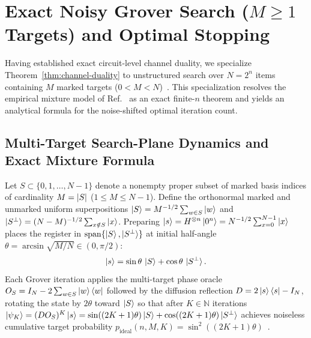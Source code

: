 \section{Exact Noisy Grover Search (\texorpdfstring{$M \ge 1$}{M >= 1} Targets) and Optimal Stopping}
\label{sec:grover}

Having established exact circuit-level channel duality, we specialize Theorem~\ref{thm:channel-duality} to unstructured search over $N = 2^n$ items containing $M$ marked targets ($0 < M < N$)~\cite{Grover1996,Boyer1998}. This specialization resolves the empirical mixture model of Ref.~\cite{SahaRoyLacalle2026} as an exact finite-$n$ theorem and yields an analytical formula for the noise-shifted optimal iteration count.

\subsection{Multi-Target Search-Plane Dynamics and Exact Mixture Formula}
\label{sec:multi-grover}

Let $S \subset \{0, 1, \dots, N - 1\}$ denote a nonempty proper subset of marked basis indices of cardinality $M = \lvert S\rvert$ ($1 \le M \le N - 1$). Define the orthonormal marked and unmarked uniform superpositions $\ket{S} = M^{-1/2}\sum_{w \in S}\ket{w}$ and $\ket{S^\perp} = (N - M)^{-1/2}\sum_{x \notin S}\ket{x}$. Preparing $\ket{s} = H^{\otimes n}\ket{0^n} = N^{-1/2}\sum_{x=0}^{N-1}\ket{x}$ places the register in $\operatorname{span}\{\ket{S}, \ket{S^\perp}\}$ at initial half-angle $\theta = \arcsin\sqrt{M/N} \in (0, \pi/2)$:
\begin{equation}
\ket{s} = \sin\theta\,\ket{S} + \cos\theta\,\ket{S^\perp}.
\label{eq:initial-search-plane}
\end{equation}
Each Grover iteration applies the multi-target phase oracle $O_S = I_N - 2\sum_{w \in S}\ket{w}\bra{w}$ followed by the diffusion reflection $D = 2\ket{s}\bra{s} - I_N$, rotating the state by $2\theta$ toward $\ket{S}$ so that after $K \in \mathbb{N}$ iterations $\ket{\psi_K} = (DO_S)^K\ket{s} = \sin((2K + 1)\theta)\ket{S} + \cos((2K + 1)\theta)\ket{S^\perp}$ achieves noiseless cumulative target probability $p_{\mathrm{ideal}}(n, M, K) = \sin^2((2K + 1)\theta)$~\cite{Boyer1998}.

